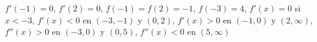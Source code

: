 \item $f'(-1) = 0$, $f'(2) = 0$, $f(-1) = f(2) = -1$, $f(-3) = 4$, $f'(x) = 0$ si $x < -3$, $f'(x) < 0$ en $(-3, -1)$ y $(0, 2)$, $f'(x) > 0$ en $(-1, 0)$ y $(2, \infty)$, $f''(x) > 0$ en $(-3, 0)$ y $(0, 5)$, $f''(x) < 0$ en $(5, \infty)$
